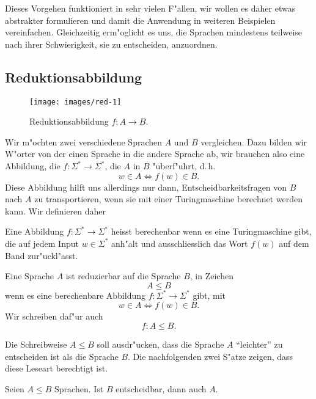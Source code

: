 Dieses Vorgehen funktioniert in sehr vielen F"allen, wir wollen es
daher etwas abstrakter formulieren und damit die Anwendung in weiteren
Beispielen vereinfachen. Gleichzeitig erm"oglicht es uns, die
Sprachen mindestens teilweise nach ihrer Schwierigkeit, sie zu entscheiden,
anzuordnen. 

\subsection{Reduktionsabbildung}
\begin{figure}
\begin{center}
\texttt{[image: images/red-1]}
\end{center}
\caption{Reduktionsabbildung $f\colon A\to B$.\label{reduktionsabbildung}}
\end{figure}
Wir m"ochten zwei verschiedene Sprachen 
$A$ und $B$ 
vergleichen. Dazu bilden wir W"orter von der einen Sprache in
die andere Sprache ab, wir brauchen also eine Abbildung, die
$f\colon\Sigma^*\to \Sigma^*$, die $A$ in $B$ "uberf"uhrt,
d.\,h.
\[
w\in A\Leftrightarrow f(w)\in B.
\]
Diese Abbildung hilft uns allerdings nur dann, Entscheidbarkeitsfragen
von $B$ nach $A$ zu transportieren, wenn sie mit einer Turingmaschine
berechnet werden kann. Wir definieren daher

\begin{definition}
Eine Abbildung $f\colon \Sigma^*\to \Sigma^*$ heisst berechenbar wenn es eine
Turingmaschine gibt, die auf jedem Input $w\in \Sigma^*$ anh"alt
und ausschliesslich das Wort $f(w)$ auf dem Band zur"uckl"asst.
\end{definition}

\begin{definition}
Eine Sprache $A$ ist reduzierbar auf die Sprache $B$, in Zeichen
\[
A\le B
\]
wenn es eine
berechenbare Abbildung $f\colon \Sigma^*\to \Sigma^*$ gibt, mit
\[
w\in A\Leftrightarrow f(w)\in B.
\]
Wir schreiben daf"ur auch
\[
f\colon A\le B.
\]
\end{definition}
Die Schreibweise $A\le B$ soll ausdr"ucken, dass die Sprache $A$ ``leichter''
zu entscheiden ist als die Sprache $B$. Die nachfolgenden zwei S"atze
zeigen, dass diese Leseart berechtigt ist.

\begin{satz}
Seien $A\le B$ Sprachen. Ist $B$ entscheidbar, dann auch $A$.
\end{satz}

